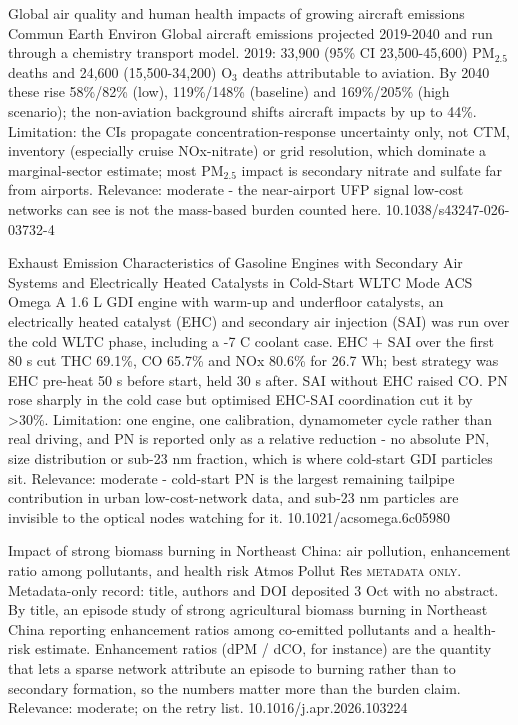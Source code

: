 \documentclass[10pt]{article}
\begin{document}
\par{}\baselineskip{}\baselineskip
{}

{Global air quality and human health impacts of growing aircraft emissions}
{Commun Earth Environ}
{Global aircraft emissions projected 2019-2040 and run through a chemistry transport model. 2019: 33,900 (95\% CI 23,500-45,600) PM$_{2.5}$ deaths and 24,600 (15,500-34,200) O$_3$ deaths attributable to aviation. By 2040 these rise 58\%/82\% (low), 119\%/148\% (baseline) and 169\%/205\% (high scenario); the non-aviation background shifts aircraft impacts by up to 44\%. Limitation: the CIs propagate concentration-response uncertainty only, not CTM, inventory (especially cruise NOx-nitrate) or grid resolution, which dominate a marginal-sector estimate; most PM$_{2.5}$ impact is secondary nitrate and sulfate far from airports. Relevance: moderate - the near-airport UFP signal low-cost networks can see is not the mass-based burden counted here.}
{10.1038/s43247-026-03732-4}

{Exhaust Emission Characteristics of Gasoline Engines with Secondary Air Systems and Electrically Heated Catalysts in Cold-Start WLTC Mode}
{ACS Omega}
{A 1.6 L GDI engine with warm-up and underfloor catalysts, an electrically heated catalyst (EHC) and secondary air injection (SAI) was run over the cold WLTC phase, including a -7 C coolant case. EHC + SAI over the first 80 s cut THC 69.1\%, CO 65.7\% and NOx 80.6\% for 26.7 Wh; best strategy was EHC pre-heat 50 s before start, held 30 s after. SAI without EHC raised CO. PN rose sharply in the cold case but optimised EHC-SAI coordination cut it by >30\%. Limitation: one engine, one calibration, dynamometer cycle rather than real driving, and PN is reported only as a relative reduction - no absolute PN, size distribution or sub-23 nm fraction, which is where cold-start GDI particles sit. Relevance: moderate - cold-start PN is the largest remaining tailpipe contribution in urban low-cost-network data, and sub-23 nm particles are invisible to the optical nodes watching for it.}
{10.1021/acsomega.6c05980}

{Impact of strong biomass burning in Northeast China: air pollution, enhancement ratio among pollutants, and health risk}
{Atmos Pollut Res}
{\textsc{metadata only.} Metadata-only record: title, authors and DOI deposited 3 Oct with no abstract. By title, an episode study of strong agricultural biomass burning in Northeast China reporting enhancement ratios among co-emitted pollutants and a health-risk estimate. Enhancement ratios (dPM / dCO, for instance) are the quantity that lets a sparse network attribute an episode to burning rather than to secondary formation, so the numbers matter more than the burden claim. Relevance: moderate; on the retry list.}
{10.1016/j.apr.2026.103224}
\end{document}
